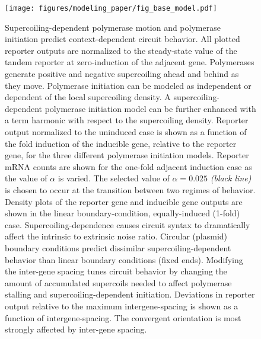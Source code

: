 \documentclass[11pt]{article}
\begin{document}
\begin{figure}[h]
    \centering
    {\texttt{[image: figures/modeling\_paper/fig\_base\_model.pdf]}
    \label{fig:supercoiling_with_energy_cartoon}
    \label{fig:reporter_output_by_init_type} 
    \label{fig:reporter_output_by_alpha}
    \label{fig:output_distribution_by_orientation}
    \label{fig:reporter_output_by_bc}
    \label{fig:intergene_spacing_cartoon}
    \label{fig:reporter_output_by_spacing_fold_induction}}
\end{figure}
\begin{figure}
    \ContinuedFloat
    \caption{Supercoiling-dependent polymerase motion and polymerase initiation predict context-dependent circuit behavior. All plotted reporter outputs are normalized to the steady-state value of the tandem reporter at zero-induction of the adjacent gene.
          Polymerases generate positive and negative supercoiling ahead and behind as they move. Polymerase initiation can be modeled as independent or dependent of the local supercoiling density. A supercoiling-dependent polymerase initiation model can be further enhanced with a term harmonic with respect to the supercoiling density. %
         Reporter output normalized to the uninduced case is shown as a function of the fold induction of the inducible gene, relative to the reporter gene, for the three different polymerase initiation models.
         Reporter mRNA counts are shown for the one-fold adjacent induction case as the value of \(\alpha\) is varied. The selected value of \(\alpha = 0.025\) \textit{(black line)} is chosen to occur at the transition between two regimes of behavior.
         Density plots of the reporter gene and inducible gene outputs are shown in the linear boundary-condition, equally-induced (1-fold) case. Supercoiling-dependence causes circuit syntax to dramatically affect the intrinsic to extrinsic noise ratio.
         Circular (plasmid) boundary conditions predict dissimilar supercoiling-dependent behavior than linear boundary conditions (fixed ends).
         Modifying the inter-gene spacing tunes circuit behavior by changing the amount of accumulated supercoils needed to affect polymerase stalling and supercoiling-dependent initiation.
         Deviations in reporter output relative to the maximum intergene-spacing is shown as a function of intergene-spacing. The convergent orientation is most strongly affected by inter-gene spacing. %
    } \label{fig:top:orientation_bc_behavior}
\end{figure}
\end{document}
